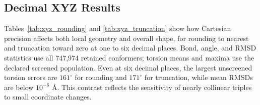 \documentclass[%
 preprint,
superscriptaddress,
 amsmath,amssymb,
 aip,
 jcp,
]{revtex4-2}
\begin{document}
\subsection{Decimal XYZ Results}

Tables~\ref{tab:xyz_rounding} and \ref{tab:xyz_truncation} show how Cartesian precision affects both local geometry and overall shape, for rounding to nearest and truncation toward zero at one to six decimal places.
Bond, angle, and RMSD statistics use all 747,974 retained conformers; torsion means and maxima use the declared screened population.
Even at six decimal places, the largest unscreened torsion errors are $161^\circ$ for rounding and $171^\circ$ for truncation, while mean RMSDs are below $10^{-6}$ \AA.
This contrast reflects the sensitivity of nearly collinear triples to small coordinate changes.
\end{document}

